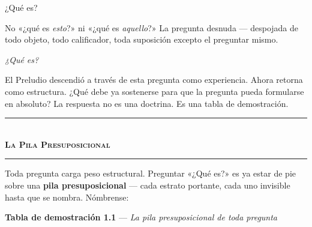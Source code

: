 \documentclass[10pt, openany, oneside]{book}
\renewcommand{\normalsize}{\fontsize{10}{13}\selectfont}
\begin{document}
\noindent ¿Qué es?

No «¿qué es \textit{esto}?» ni «¿qué es \textit{aquello}?» La pregunta desnuda --- despojada de todo objeto, todo calificador, toda suposición excepto el preguntar mismo.

\textit{¿Qué es?}

El Preludio descendió a través de esta pregunta como experiencia. Ahora retorna como estructura. ¿Qué debe ya sostenerse para que la pregunta pueda formularse en absoluto? La respuesta no es una doctrina. Es una tabla de demostración.

\vspace{1.5em}


\begin{center}
    \rule{0.3\textwidth}{0.4pt}\\[0.5em]
    {\normalsize\bfseries\scshape La Pila Presuposicional}\\[0.3em]
    \rule{0.3\textwidth}{0.4pt}
\end{center}

\vspace{1em}

Toda pregunta carga peso estructural. Preguntar «¿Qué es?» es ya estar de pie sobre una \textbf{pila presuposicional} --- cada estrato portante, cada uno invisible hasta que se nombra. Nómbrense:

\vspace{0.8em}

\textbf{Tabla de demostración 1.1} --- \textit{La pila presuposicional de toda pregunta}

\vspace{0.5em}
\end{document}
